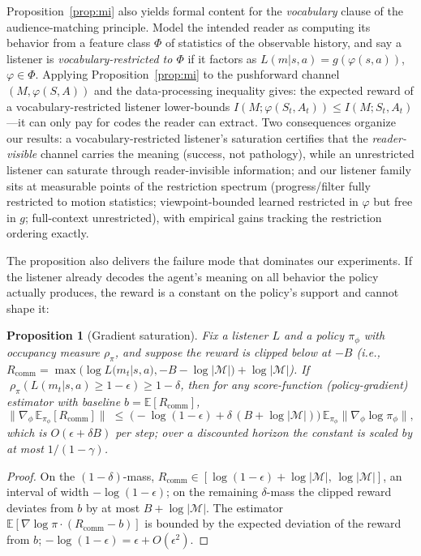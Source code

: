\documentclass{article}
\newtheorem{proposition}{Proposition}
\newcommand{\Rcomm}{R_{\text{comm}}}
\begin{document}
Proposition~\ref{prop:mi} also yields formal content for the \emph{vocabulary} clause of the audience-matching principle. Model the intended reader as computing its behavior from a feature class $\Phi$ of statistics of the observable history, and say a listener is \emph{vocabulary-restricted to $\Phi$} if it factors as $L(m|s,a) = g(\varphi(s,a))$, $\varphi \in \Phi$. Applying Proposition~\ref{prop:mi} to the pushforward channel $(M, \varphi(S,A))$ and the data-processing inequality gives: the expected reward of a vocabulary-restricted listener lower-bounds $I(M; \varphi(S_t,A_t)) \leq I(M; S_t, A_t)$---it can only pay for codes the reader can extract. Two consequences organize our results: a vocabulary-restricted listener's saturation certifies that the \emph{reader-visible} channel carries the meaning (success, not pathology), while an unrestricted listener can saturate through reader-invisible information; and our listener family sits at measurable points of the restriction spectrum (progress/filter fully restricted to motion statistics; viewpoint-bounded learned restricted in $\varphi$ but free in $g$; full-context unrestricted), with empirical gains tracking the restriction ordering exactly.

The proposition also delivers the failure mode that dominates our experiments. If the listener already decodes the agent's meaning on all behavior the policy actually produces, the reward is a constant on the policy's support and cannot shape it:

\begin{proposition}[Gradient saturation]
\label{prop:saturation}
Fix a listener $L$ and a policy $\pi_\phi$ with occupancy measure $\rho_\pi$, and suppose the reward is clipped below at $-B$ (i.e., $\Rcomm = \max(\log L(m_t|s,a), -B - \log|\mathcal{M}|) + \log|\mathcal{M}|$). If $\;\rho_\pi\!\left(L(m_t|s,a) \geq 1-\epsilon\right) \geq 1-\delta$, then for any score-function (policy-gradient) estimator with baseline $b = \mathbb{E}[\Rcomm]$,
\begin{equation}
\big\|\nabla_\phi\, \mathbb{E}_{\pi_\phi}[\Rcomm]\big\| \;\leq\; \big(\!-\!\log(1-\epsilon) + \delta\,(B + \log|\mathcal{M}|)\big)\, \mathbb{E}_{\pi_\phi}\big\|\nabla_\phi \log \pi_\phi\big\|,
\end{equation}
which is $O(\epsilon + \delta B)$ per step; over a discounted horizon the constant is scaled by at most $1/(1-\gamma)$.
\end{proposition}

\begin{proof}
On the $(1-\delta)$-mass, $\Rcomm \in [\log(1-\epsilon) + \log|\mathcal{M}|,\, \log|\mathcal{M}|]$, an interval of width $-\log(1-\epsilon)$; on the remaining $\delta$-mass the clipped reward deviates from $b$ by at most $B + \log|\mathcal{M}|$. The estimator $\mathbb{E}[\nabla \log \pi \cdot (\Rcomm - b)]$ is bounded by the expected deviation of the reward from $b$; $-\log(1-\epsilon) = \epsilon + O(\epsilon^2)$.
\end{proof}
\end{document}
